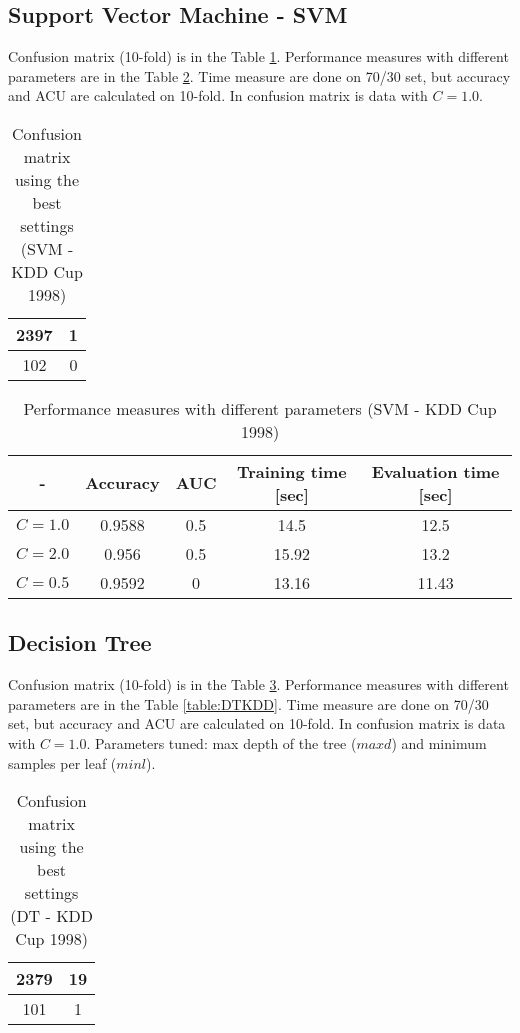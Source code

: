 \documentclass[11pt,a4paper,titlepage]{article}
\begin{document}
\subsection{Support Vector Machine - SVM}

Confusion matrix (10-fold) is in the Table \ref{table:confusionMatrixSVMKDD}. Performance measures with different parameters are in the Table \ref{table:SVMKDD}. Time measure are done on 70/30 set, but accuracy and ACU are calculated on 10-fold. In confusion matrix is data with $C = 1.0$.
\begin{table}
  \centering
  \begin{tabular}{| c | c |}
    \hline
   		2397 & 1 \\ \hline
    	102 & 0\\
    \hline
  \end{tabular}
  \caption{Confusion matrix using the best settings (SVM - KDD Cup 1998)}
  \label{table:confusionMatrixSVMKDD}
  \end{table}
  
  \begin{table}
  \centering
  \begin{tabular}{| c | c | c | c | c |}
    \hline
     		-	   & Accuracy & 	AUC 	& Training time [sec] & Evaluation time [sec] \\ \hline
    $C = 1.0$ &  0.9588	  	&     0.5		& 		14.5			  & 		12.5 		\\ \hline
    $C = 2.0$ & 	0.956	  & 	0.5 		& 		15.92			  &			13.2 		\\ \hline
    $C = 0.5$ & 		  0.9592 		& 		0			  &			13.16 & 11.43		\\ 
    \hline
  \end{tabular}
  \caption{Performance measures with different parameters (SVM - KDD Cup 1998)}
  \label{table:SVMKDD}
  \end{table}

\subsection{Decision Tree}

Confusion matrix (10-fold) is in the Table \ref{table:confusionMatrixDTKDD}. Performance measures with different parameters are in the Table \ref{table:DTKDD}. Time measure are done on 70/30 set, but accuracy and ACU are calculated on 10-fold. In confusion matrix is data with $C = 1.0$. Parameters tuned: max depth of the tree ($maxd$) and minimum samples per leaf ($minl$).
\begin{table}
  \centering
  \begin{tabular}{| c | c |}
    \hline
    2379 & 19  \\ \hline
    101 & 1 \\
    \hline
  \end{tabular}
  \caption{Confusion matrix using the best settings (DT - KDD Cup 1998)}
  \label{table:confusionMatrixDTKDD}
  \end{table}
  
\end{document}
